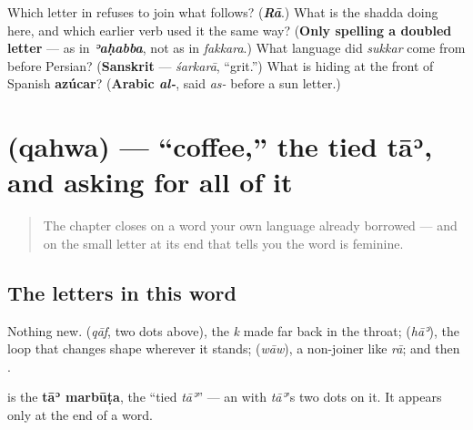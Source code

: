 \begin{tcolorbox}[breakable,colback=teal!4,colframe=teal!35!black,title={Before you move on}]
Which letter in \textbf{} refuses to join what follows? (\emph{\textbf{Rā}}.) What is the shadda doing here, and which earlier verb used it the same way? (\textbf{Only spelling a doubled letter} — as in \emph{\textbf{ʾaḥabba}}, not as in \emph{fakkara}.) What language did \emph{sukkar} come from before Persian? (\textbf{Sanskrit} — \emph{śarkarā}, \textquotedblleft{}grit.\textquotedblright{}) What is hiding at the front of Spanish \textbf{azúcar}? (\textbf{Arabic \emph{al-}}, said \emph{as-} before a sun letter.)
\end{tcolorbox}
\section[\texorpdfstring{\ar{قهوة} (qahwa)}{قهوة (qahwa)}]{ (qahwa) — \textquotedblleft{}coffee,\textquotedblright{} the tied tāʾ, and asking for all of it}

\label{lesson:AR-C33-qahwa}



\begin{quote}
The chapter closes on a word your own language already borrowed — and on the small letter at its end that tells you the word is feminine.
\end{quote}

\subsection*{The letters in this word}
Nothing new. \textbf{} (\emph{qāf}, two dots above), the \emph{k} made far back in the throat; \textbf{} (\emph{hāʾ}), the loop that changes shape wherever it stands; \textbf{} (\emph{wāw}), a non-joiner like \emph{rā}; and then \textbf{}.

\textbf{} is the \textbf{tāʾ marbūṭa}, the \textquotedblleft{}tied \emph{tāʾ}\textquotedblright{} — an \textbf{} with \emph{tāʾ}'s two dots on it. It appears only at the end of a word.

